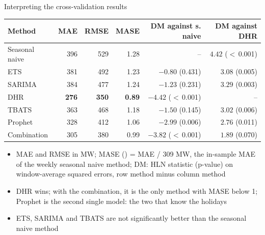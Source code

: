 \begin{frame}{Interpreting the cross-validation results}
\itemsize{\footnotesize}
\begin{center}
\scriptsize
\begin{tabular}{lrrrrr}
\toprule
\textbf{Method} & \textbf{MAE} & \textbf{RMSE} & \textbf{MASE} & \textbf{DM against s. naive} & \textbf{DM against DHR} \\
\midrule
Seasonal naive & 396 & 529 & 1.28 & -- & $4.42$ ($<$\,0.001) \\
ETS & 381 & 492 & 1.23 & $\ensuremath{-}0.80$ (0.431) & $3.08$ (0.005) \\
SARIMA & 384 & 477 & 1.24 & $\ensuremath{-}1.23$ (0.231) & $3.29$ (0.003) \\
DHR & \textbf{276} & \textbf{350} & \textbf{0.89} & $\ensuremath{-}4.42$ ($<$\,0.001) & -- \\
TBATS & 363 & 468 & 1.18 & $\ensuremath{-}1.50$ (0.145) & $3.02$ (0.006) \\
Prophet & 328 & 412 & 1.06 & $\ensuremath{-}2.99$ (0.006) & $2.76$ (0.011) \\
Combination & 305 & 380 & 0.99 & $\ensuremath{-}3.82$ ($<$\,0.001) & $1.89$ (0.070) \\
\bottomrule
\end{tabular}
\end{center}
\begin{itemize}
    \item MAE and RMSE in MW; MASE () = MAE / 309 MW, the in-sample MAE of the weekly seasonal naive method; DM: HLN statistic (p-value) on window-average squared errors, row method minus column method
    \item DHR wins; with the combination, it is the only method with MASE below 1; Prophet is the second single model: the two that know the holidays
    \item ETS, SARIMA and TBATS are not significantly better than the seasonal naive method
\end{itemize}
\end{frame}

